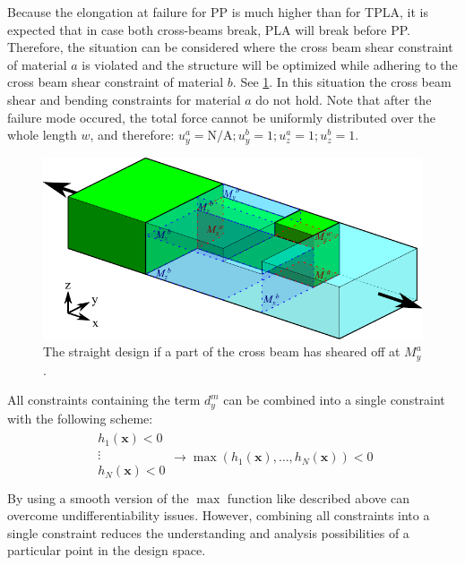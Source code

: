 Because the elongation at failure for PP is much higher than for TPLA, it is expected that in case both cross-beams break, PLA will break before PP.
Therefore, the situation can be considered where the cross beam shear constraint of material $a$ is violated and the structure will be optimized while adhering to the cross beam shear constraint of material $b$.
See \cref{fig:straight_model_broken}.
In this situation the cross beam shear and bending constraints for material $a$ do not hold.
Note that after the failure mode occured, the total force cannot be uniformly distributed over the whole length $w$, and therefore:
$
u_y^a = \text{N/A};
u_y^b = 1 ;
u_z^a = 1 ;
u_z^b = 1
$.

\begin{figure}[H]
	\centering
	\includegraphics[width=\columnwidth]{sources/method/straight_model_v3_broken.pdf}
	\caption{The straight design if a part of the cross beam has sheared off at $M_y^a$.}
	\label{fig:straight_model_broken}
\end{figure}

All constraints containing the term $d_y^m$ can be combined into a single constraint with the following scheme:
\begin{align*}
	\begin{array}{l}
		h_1(\mathbf{x}) < 0 \\
		\vdots \\
		h_N(\mathbf{x}) < 0 \\
	\end{array}
	\to
	\max \left(h_1(\mathbf{x}), \dots, h_N(\mathbf{x}) \right) < 0
\end{align*}
By using a smooth version of the $\max$ function like described above can overcome undifferentiability issues.
However, combining all constraints into a single constraint reduces the understanding and analysis possibilities of a particular point in the design space. 


